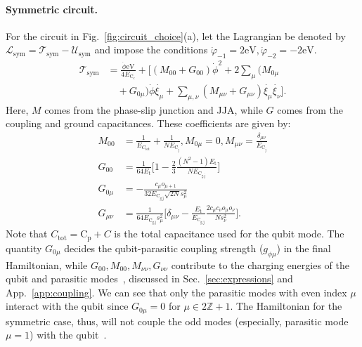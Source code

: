 \documentclass[%
reprint,
superscriptaddress,
 amsmath,amssymb,
 aps,
 prx,
longbibliography,
floatfix,
]{revtex4-2}
\begin{document}
\paragraph{Symmetric circuit.} For the circuit in Fig.~\ref{fig:circuit_choice}(a), let the Lagrangian be denoted by $\mathcal{L}_\textrm{sym}=\mathcal{T}_\textrm{sym}-\mathcal{U}_\textrm{sym}$ and impose the conditions $\dot{\varphi}_{-1}=2\textrm{eV}, \dot{\varphi}_{-2}=-2\textrm{eV}$.
\begin{align}
\mathcal{T}_\textrm{sym}&=\frac{\dot{\phi}\textrm{eV}}{4E_{\textrm{C}_\textrm{c}}}+\Big[(M_{00}+G_{00})\dot{\phi}^2+2\sum_{\mu}(M_{0\mu}\nonumber\\&\quad+G_{0\mu})\dot{\phi}\dot{\xi_\mu}+\sum_{\mu,\nu}(M_{\mu\nu}+G_{\mu\nu})\dot{\xi_\mu}\dot{\xi_\nu}\Big].\end{align}
Here, $M$ comes from the phase-slip junction and JJA, while $G$ comes from the coupling and ground capacitances. These coefficients are given by:
\begin{align}
M_{00}&=\frac{1}{E_{C_\textrm{tot}}}+\frac{1}{NE_{\textrm{C}_\textrm{j}}}, M_{0\mu}=0,    M_{\mu\nu}=\frac{\delta_{\mu\nu}}{E_{\textrm{C}_\textrm{j}}}\\
G_{00}&=\frac{1}{64E_{\textrm{t}}}\Big[1-\frac{2}{3}\frac{(N^2-1)E_\textrm{t}}{NE_{\textrm{C}_\textrm{g,j}}}\Big]\\
G_{0\mu}&=-\frac{c_\mu o_{\mu+1}}{32E_{\textrm{C}_\textrm{g,j}}\sqrt{2N}s_\mu^2}\\
G_{\mu\nu}&=\frac{1}{64E_{\textrm{C}_\textrm{g,j}}s_\mu^2}\Big[\delta_{\mu\nu}-\frac{E_{\textrm{t}}}{E_{\textrm{C}_\textrm{g,j}}}\frac{2c_\mu c_\nu o_\mu o_\nu}{N s_\nu^2}\Big].
\end{align}
Note that $C_\textrm{tot}=\textrm{C}_\textrm{p}+C$ is the total capacitance used for the qubit mode. The quantity $G_{0\mu}$ decides the qubit-parasitic coupling strength ($g_{\phi\mu}$) in the final Hamiltonian, while $G_{00}, M_{00}, M_{\nu\nu},  G_{\nu\nu}$ contribute to the charging energies of the qubit and parasitic modes~\cite{viola2015collective}, discussed in Sec.~\ref{sec:expressions} and App.~\ref{app:coupling}. We can see that only the parasitic modes with even index $\mu$ interact with the qubit since $G_{0\mu}=0$ for $\mu\in 2\mathbb{Z}+1$. The Hamiltonian for the symmetric case, thus, will not couple the odd modes (especially, parasitic mode $\mu=1$) with the qubit~\cite{viola2015collective}.
\end{document}
